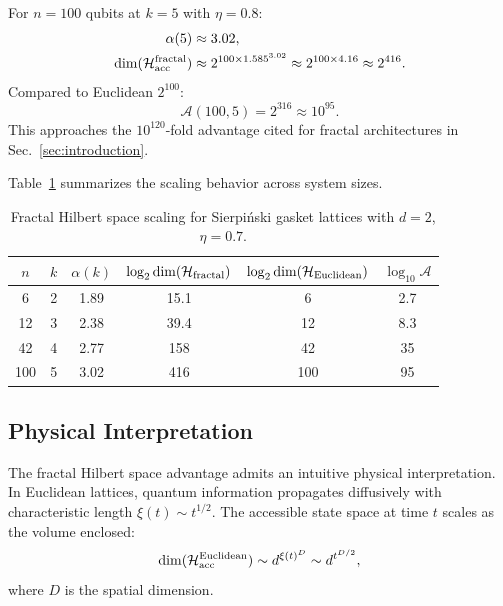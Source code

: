\begin{example}
\label{ex:100qubit}
For $n = 100$ qubits at $k = 5$ with $\eta = 0.8$:
\begin{align}
\alpha(5) &\approx 3.02, \\
\dim(\mathcal{H}_{\mathrm{acc}}^{\mathrm{fractal}}) &\approx 2^{100 \times 1.585^{3.02}}
\approx 2^{100 \times 4.16} \approx 2^{416}.
\end{align}
Compared to Euclidean $2^{100}$:
\begin{equation}
\mathcal{A}(100, 5) = 2^{316} \approx 10^{95}.
\end{equation}
This approaches the $10^{120}$-fold advantage cited for fractal
architectures in Sec.~\ref{sec:introduction}.
\end{example}

Table~\ref{tab:scaling} summarizes the scaling behavior across
system sizes.

\begin{table}[h]
\caption{Fractal Hilbert space scaling for Sierpi\'{n}ski gasket
lattices with $d = 2$, $\eta = 0.7$.}
\label{tab:scaling}
\begin{ruledtabular}
\begin{tabular}{cccccc}
$n$ & $k$ & $\alpha(k)$ & $\log_2 \dim(\mathcal{H}_{\mathrm{fractal}})$ &
$\log_2 \dim(\mathcal{H}_{\mathrm{Euclidean}})$ & $\log_{10} \mathcal{A}$ \\
\hline
6 & 2 & 1.89 & 15.1 & 6 & 2.7 \\
12 & 3 & 2.38 & 39.4 & 12 & 8.3 \\
42 & 4 & 2.77 & 158 & 42 & 35 \\
100 & 5 & 3.02 & 416 & 100 & 95 \\
\end{tabular}
\end{ruledtabular}
\end{table}

\subsection{Physical Interpretation}

The fractal Hilbert space advantage admits an intuitive physical
interpretation. In Euclidean lattices, quantum information propagates
diffusively with characteristic length $\xi(t) \sim t^{1/2}$. The
accessible state space at time $t$ scales as the volume enclosed:
\begin{equation}
\dim(\mathcal{H}_{\mathrm{acc}}^{\mathrm{Euclidean}}) \sim d^{\xi(t)^D}
\sim d^{t^{D/2}},
\end{equation}
where $D$ is the spatial dimension.

